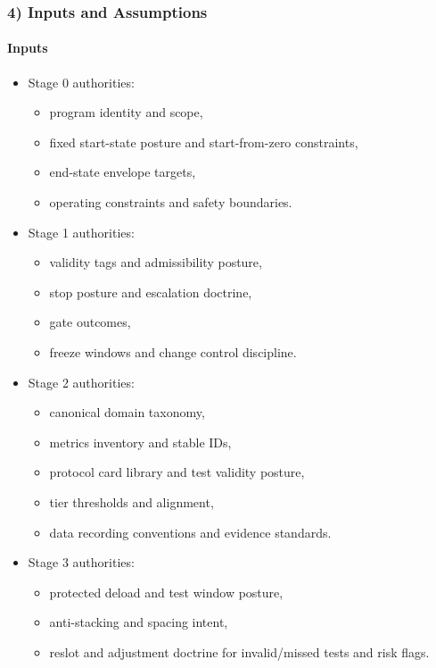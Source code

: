 \documentclass[10pt]{article}
\begin{document}
\subsubsection*{4) Inputs and Assumptions}

\paragraph*{Inputs}

\begin{itemize}
\item Stage 0 authorities:
  \begin{itemize}
  \item program identity and scope,
  \item fixed start-state posture and start-from-zero constraints,
  \item end-state envelope targets,
  \item operating constraints and safety boundaries.
  \end{itemize}
\item Stage 1 authorities:
  \begin{itemize}
  \item validity tags and admissibility posture,
  \item stop posture and escalation doctrine,
  \item gate outcomes,
  \item freeze windows and change control discipline.
  \end{itemize}
\item Stage 2 authorities:
  \begin{itemize}
  \item canonical domain taxonomy,
  \item metrics inventory and stable IDs,
  \item protocol card library and test validity posture,
  \item tier thresholds and alignment,
  \item data recording conventions and evidence standards.
  \end{itemize}
\item Stage 3 authorities:
  \begin{itemize}
  \item protected deload and test window posture,
  \item anti-stacking and spacing intent,
  \item reslot and adjustment doctrine for invalid/missed tests and risk flags.
  \end{itemize}

\end{itemize}
\end{document}
